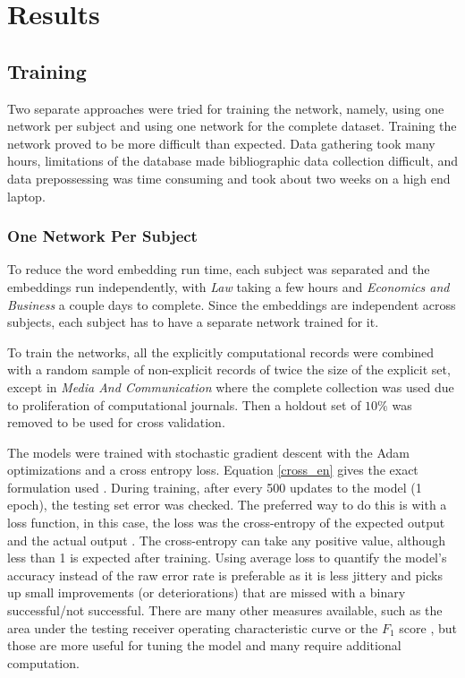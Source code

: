 \documentclass[12pt, a4paper]{article}
\begin{document}
\section{Results}

\subsection{Training}

 Two separate approaches were tried for training the network, namely, using one network per subject and using one network for the complete dataset. Training the network proved to be more difficult than expected. Data gathering took many hours, limitations of the database made bibliographic data collection difficult, and data prepossessing was time consuming and took about two weeks on a high end laptop.  

\subsubsection{One Network Per Subject}

To reduce the word embedding run time, each subject was separated and the embeddings run independently, with \textit{Law} taking a few hours and \textit{Economics and Business} a couple days to complete. Since the embeddings are independent across subjects, each subject has to have a separate network trained for it.

To train the networks, all the explicitly computational records were combined with a random sample of non-explicit records of twice the size of the explicit set, except in \textit{Media And Communication} where the complete collection was used due to proliferation of computational journals. Then a holdout set of $10\%$ was removed to be used for cross validation.

The models were trained with stochastic gradient descent with the Adam optimizations \citep{collins2012advertiser} and a cross entropy loss. Equation \ref{cross_en} gives the exact formulation used \citep{pytorch}. During training, after every 500 updates to the model (1 epoch), the testing set error was checked. The preferred way to do this is with a loss function, in this case, the loss \citep{deeploss} was the cross-entropy of the expected output and the actual output . The cross-entropy can take any positive value, although less than 1 is expected after training. Using average loss to quantify the model's accuracy instead of the raw error rate is preferable as it is less jittery \citep{deeploss} and picks up small improvements (or deteriorations) that are missed with a binary successful/not successful. There are many other measures available, such as the area under the testing receiver operating characteristic curve or the $F_1$ score \citep{james2013introduction}, but those are more useful for tuning the model and many require additional computation.
\end{document}
